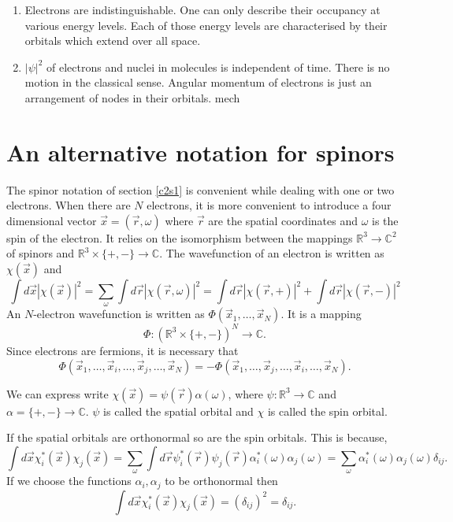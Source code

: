 \begin{enumerate}
\item Electrons are indistinguishable. One can only describe their occupancy
at various energy levels. Each of those energy levels are characterised by
their orbitals which extend over all space.

\item $|\psi|^2$ of electrons and nuclei in molecules is independent of time.
There is no motion in the classical sense. Angular momentum of electrons is
just an arrangement of nodes in their orbitals. 
mech
\end{enumerate}

\section{An alternative notation for spinors}\label{c2s4}
The spinor notation of section \ref{c2s1} is convenient while dealing with one
or two electrons. When there are $N$ electrons, it is more convenient to 
introduce a four dimensional vector $\vec{x} = (\vec{r}, \omega)$ where 
$\vec{r}$ are the spatial coordinates and $\omega$ is  the spin of the electron. 
It relies on the isomorphism between the mappings $\mathbb{R}^3 \rightarrow 
\mathbb{C}^2$ of spinors and $\mathbb{R}^3 \times \{+, -\} \rightarrow 
\mathbb{C}$. The wavefunction of an electron is written as $\chi(\vec{x})$ and
\begin{equation}\label{c2e36}
\int d\vec{x} |\chi(\vec{x})|^2=\sum_\omega\int d\vec{r}|\chi(\vec{r}, \omega)
|^2 = \int d\vec{r}|\chi(\vec{r}, +)|^2 + \int d\vec{r}|\chi(\vec{r}, -)|^2
\end{equation}
An $N$-electron wavefunction is written as $\Phi(\vec{x}_1, \ldots, \vec{x}_N)$.
It is a mapping 
\[
\Phi: (\mathbb{R}^3 \times \{+, -\})^N \rightarrow \mathbb{C}.
\]
Since electrons are fermions, it is necessary that
\begin{equation}\label{c2e37}
\Phi(\vec{x}_1, \ldots, \vec{x}_i, \ldots, \vec{x}_j, \ldots, \vec{x}_N) = 
-\Phi(\vec{x}_1, \ldots, \vec{x}_j, \ldots, \vec{x}_i, \ldots, \vec{x}_N).
\end{equation}

We can express write $\chi(\vec{x}) = \psi(\vec{r})\alpha(\omega)$, where
$\psi: \mathbb{R}^3 \rightarrow \mathbb{C}$ and $\alpha = \{+, -\} \rightarrow
\mathbb{C}$. $\psi$ is called the spatial orbital and $\chi$ is called the
spin orbital.

If the spatial orbitals are orthonormal so are the spin orbitals. This is 
because,
\[
\int d\vec{x}\chi_i^\ast(\vec{x})\chi_j(\vec{x}) = \sum_\omega\int d\vec{r}
\psi_i^\ast(\vec{r})\psi_j(\vec{r}) \alpha_i^\ast(\omega)\alpha_j(\omega)
= \sum_\omega\alpha_i^\ast(\omega)\alpha_j(\omega)\delta_{ij}.
\]
If we choose the functions $\alpha_i, \alpha_j$ to be orthonormal then
\[
\int d\vec{x}\chi_i^\ast(\vec{x})\chi_j(\vec{x}) = (\delta_{ij})^2 = 
\delta_{ij}.
\]

